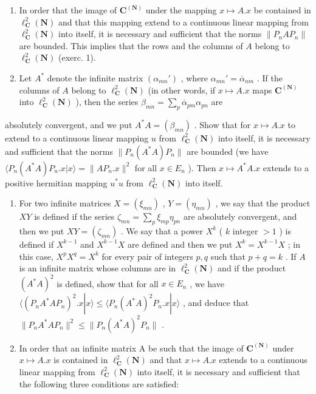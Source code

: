 \begin{enumerate}
\begin{enumerate}
\def\labelenumi{\alph{enumi})}
\item
  In order that the image of \(\mathbf{C}^{(\mathbf{N})}\) under the mapping \(x\mapsto A.x\) be contained in \(\ell_{\mathbf{C}}^2 (\mathbf{N})\) and that this mapping extend to a continuous linear mapping from \(\ell_{\mathbf{C}}^2 (\mathbf{N})\) into itself, it is necessary and sufficient that the norms \(\| P_nAP_n\|\) are bounded. This implies that the rows and the columns of \(A\) belong to \(\ell_{\mathbf{C}}^2 (\mathbf{N})\) (exerc. 1).
\item
  Let \(A^*\) denote the infinite matrix \((\alpha_{mn}')\) , where \(\alpha_{mn}' = \overline{\alpha}_{nm}\) . If the columns of \(A\) belong to \(\ell_{\mathbf{C}}^2(\mathbf{N})\) (in other words, if \(x \mapsto A.x\) maps \(\mathbf{C}^{(\mathbf{N})}\) into \(\ell_{\mathbf{C}}^2(\mathbf{N})\) ), then the series \(\beta_{mn} = \sum_{p} \overline{\alpha}_{pm} \alpha_{pn}\) are
\end{enumerate}

absolutely convergent, and we put \(A^{*}A = (\beta_{mn})\) . Show that for \(x \mapsto A.x\) to extend to a continuous linear mapping \(u\) from \(\ell_{\mathbf{C}}^{2}(\mathbf{N})\) into itself, it is necessary and sufficient that the norms \(\| P_n(A^*A)P_n\|\) are bounded (we have \(\langle P_n(A^*A)P_n.x|x\rangle = \| AP_n .x\|^2\) for all \(x\in E_n\) ). Then \(x\mapsto A^{*}A.x\) extends to a positive hermitian mapping \(u^{*}u\) from \(\ell_{\mathbf{C}}^{2}(\mathbf{N})\) into itself.

\begin{enumerate}
\def\labelenumi{\alph{enumi})}
\setcounter{enumi}{2}
\item
  For two infinite matrices \(X = (\xi_{mn})\) , \(Y = (\eta_{mn})\) , we say that the product \(XY\) is defined if the series \(\zeta_{mn} = \sum_{p} \xi_{mp} \eta_{pn}\) are absolutely convergent, and then we put \(XY = (\zeta_{mn})\) . We say that a power \(X^k\) ( \(k\) integer \(> 1\) ) is defined if \(X^{k-1}\) and \(X^{k-1}X\) are defined and then we put \(X^k = X^{k-1}X\) ; in this case, \(X^pX^q = X^k\) for every pair of integers \(p, q\) such that \(p + q = k\) . If \(A\) is an infinite matrix whose columns are in \(\ell_{\mathbf{C}}^2(\mathbf{N})\) and if the product \((A^*A)^2\) is defined, show that for all \(x \in E_n\) , we have \(\langle (P_nA^*AP_n)^2.x|x\rangle \leqslant \langle P_n(A^*A)^2P_n.x|x\rangle\) , and deduce that \(\| P_nA^*AP_n\|^2 \leqslant \| P_n(A^*A)^2P_n\|\) .
\item
  In order that an infinite matrix A be such that the image of \(\mathbf{C}^{(\mathbf{N})}\) under \(x\mapsto A.x\) is contained in \(\ell_{\mathbf{C}}^2 (\mathbf{N})\) and that \(x\mapsto A.x\) extends to a continuous linear mapping from \(\ell_{\mathbf{C}}^2 (\mathbf{N})\) into itself, it is necessary and sufficient that the following three conditions are satisfied:
\end{enumerate}


\end{enumerate}
